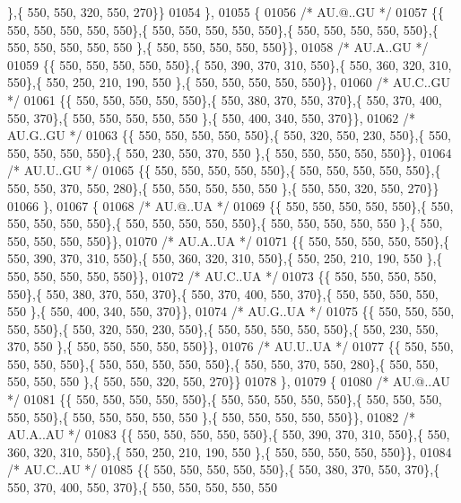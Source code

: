 \begin{DoxyCode}
      \},\{ 550, 550, 320, 550, 270\}\}
01054 \},
01055 \{
01056 \textcolor{comment}{/* AU.@..GU */}
01057 \{\{ 550, 550, 550, 550, 550\},\{ 550, 550, 550, 550, 550\},\{ 550, 550, 550, 550, 550\},\{ 550, 550, 550, 550, 550
      \},\{ 550, 550, 550, 550, 550\}\},
01058 \textcolor{comment}{/* AU.A..GU */}
01059 \{\{ 550, 550, 550, 550, 550\},\{ 550, 390, 370, 310, 550\},\{ 550, 360, 320, 310, 550\},\{ 550, 250, 210, 190, 550
      \},\{ 550, 550, 550, 550, 550\}\},
01060 \textcolor{comment}{/* AU.C..GU */}
01061 \{\{ 550, 550, 550, 550, 550\},\{ 550, 380, 370, 550, 370\},\{ 550, 370, 400, 550, 370\},\{ 550, 550, 550, 550, 550
      \},\{ 550, 400, 340, 550, 370\}\},
01062 \textcolor{comment}{/* AU.G..GU */}
01063 \{\{ 550, 550, 550, 550, 550\},\{ 550, 320, 550, 230, 550\},\{ 550, 550, 550, 550, 550\},\{ 550, 230, 550, 370, 550
      \},\{ 550, 550, 550, 550, 550\}\},
01064 \textcolor{comment}{/* AU.U..GU */}
01065 \{\{ 550, 550, 550, 550, 550\},\{ 550, 550, 550, 550, 550\},\{ 550, 550, 370, 550, 280\},\{ 550, 550, 550, 550, 550
      \},\{ 550, 550, 320, 550, 270\}\}
01066 \},
01067 \{
01068 \textcolor{comment}{/* AU.@..UA */}
01069 \{\{ 550, 550, 550, 550, 550\},\{ 550, 550, 550, 550, 550\},\{ 550, 550, 550, 550, 550\},\{ 550, 550, 550, 550, 550
      \},\{ 550, 550, 550, 550, 550\}\},
01070 \textcolor{comment}{/* AU.A..UA */}
01071 \{\{ 550, 550, 550, 550, 550\},\{ 550, 390, 370, 310, 550\},\{ 550, 360, 320, 310, 550\},\{ 550, 250, 210, 190, 550
      \},\{ 550, 550, 550, 550, 550\}\},
01072 \textcolor{comment}{/* AU.C..UA */}
01073 \{\{ 550, 550, 550, 550, 550\},\{ 550, 380, 370, 550, 370\},\{ 550, 370, 400, 550, 370\},\{ 550, 550, 550, 550, 550
      \},\{ 550, 400, 340, 550, 370\}\},
01074 \textcolor{comment}{/* AU.G..UA */}
01075 \{\{ 550, 550, 550, 550, 550\},\{ 550, 320, 550, 230, 550\},\{ 550, 550, 550, 550, 550\},\{ 550, 230, 550, 370, 550
      \},\{ 550, 550, 550, 550, 550\}\},
01076 \textcolor{comment}{/* AU.U..UA */}
01077 \{\{ 550, 550, 550, 550, 550\},\{ 550, 550, 550, 550, 550\},\{ 550, 550, 370, 550, 280\},\{ 550, 550, 550, 550, 550
      \},\{ 550, 550, 320, 550, 270\}\}
01078 \},
01079 \{
01080 \textcolor{comment}{/* AU.@..AU */}
01081 \{\{ 550, 550, 550, 550, 550\},\{ 550, 550, 550, 550, 550\},\{ 550, 550, 550, 550, 550\},\{ 550, 550, 550, 550, 550
      \},\{ 550, 550, 550, 550, 550\}\},
01082 \textcolor{comment}{/* AU.A..AU */}
01083 \{\{ 550, 550, 550, 550, 550\},\{ 550, 390, 370, 310, 550\},\{ 550, 360, 320, 310, 550\},\{ 550, 250, 210, 190, 550
      \},\{ 550, 550, 550, 550, 550\}\},
01084 \textcolor{comment}{/* AU.C..AU */}
01085 \{\{ 550, 550, 550, 550, 550\},\{ 550, 380, 370, 550, 370\},\{ 550, 370, 400, 550, 370\},\{ 550, 550, 550, 550, 550

\end{DoxyCode}
